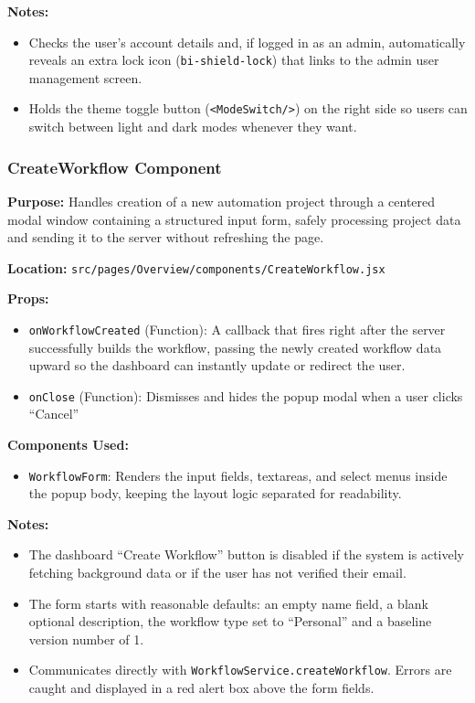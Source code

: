 \vspace{0.2cm}
\noindent\textbf{Notes:}
\begin{itemize}
    \item Checks the user's account details and, if logged in as an admin, automatically reveals an extra lock icon (\texttt{bi-shield-lock}) that links to the admin user management screen.
    \item Holds the theme toggle button (\texttt{<ModeSwitch/>}) on the right side so users can switch between light and dark modes whenever they want.
\end{itemize}


\subsubsection{CreateWorkflow Component}

\textbf{Purpose:} Handles creation of a new automation project through a centered modal window containing a structured input form, safely processing project data and sending it to the server without refreshing the page.

\vspace{0.2cm}
\noindent\textbf{Location:} \texttt{src/pages/Overview/components/CreateWorkflow.jsx}

\vspace{0.2cm}
\noindent\textbf{Props:}
\begin{itemize}
    \item \texttt{onWorkflowCreated} (Function): A callback that fires right after the server successfully builds the workflow, passing the newly created workflow data upward so the dashboard can instantly update or redirect the user.
    \item \texttt{onClose} (Function): Dismisses and hides the popup modal when a user clicks ``Cancel'' 
\end{itemize}

\vspace{0.2cm}
\noindent\textbf{Components Used:}
\begin{itemize}
    \item \texttt{WorkflowForm}: Renders the input fields, textareas, and select menus inside the popup body, keeping the layout logic separated for readability.
\end{itemize}

\vspace{0.2cm}
\noindent\textbf{Notes:}
\begin{itemize}
    \item The dashboard ``Create Workflow'' button is disabled if the system is actively fetching background data or if the user has not verified their email.
    \item The form starts with reasonable defaults: an empty name field, a blank optional description, the workflow type set to ``Personal'' and a baseline version number of 1.
    \item Communicates directly with \texttt{WorkflowService.createWorkflow}. Errors are caught and displayed in a red alert box above the form fields.
\end{itemize}

